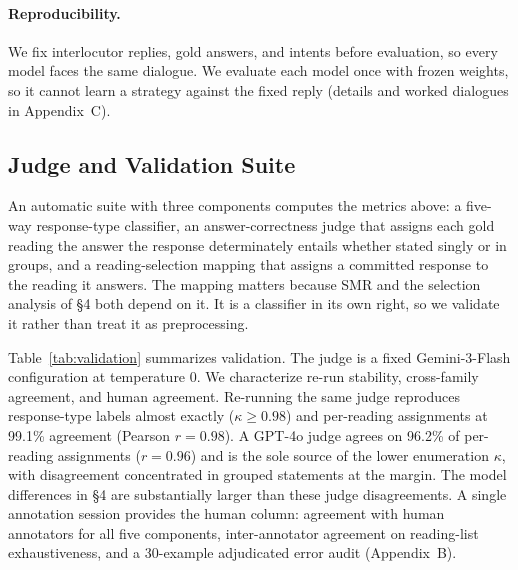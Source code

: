 \paragraph{Reproducibility.} We fix interlocutor replies, gold answers, and intents before evaluation, so every model faces the same dialogue. We evaluate each model once with frozen weights, so it cannot learn a strategy against the fixed reply (details and worked dialogues in Appendix~C).

\subsection{Judge and Validation Suite}
\label{sec:judge}


An automatic suite with three components computes the metrics above: a five-way response-type classifier, an answer-correctness judge that assigns each gold reading the answer the response determinately entails whether stated singly or in groups, and a reading-selection mapping that assigns a committed response to the reading it answers. The mapping matters because SMR and the selection analysis of \S4 both depend on it. It is a classifier in its own right, so we validate it rather than treat it as preprocessing.

Table~\ref{tab:validation} summarizes validation. The judge is a fixed Gemini-3-Flash configuration at temperature 0. We characterize re-run stability, cross-family agreement, and human agreement. Re-running the same judge reproduces response-type labels almost exactly ($\kappa \geq 0.98$) and per-reading assignments at 99.1\% agreement (Pearson $r = 0.98$). A GPT-4o judge agrees on 96.2\% of per-reading assignments ($r = 0.96$) and is the sole source of the lower enumeration $\kappa$, with disagreement concentrated in grouped statements at the margin. The model differences in \S4 are substantially larger than these judge disagreements. A single annotation session provides the human column: agreement with human annotators for all five components, inter-annotator agreement on reading-list exhaustiveness, and a 30-example adjudicated error audit (Appendix~B).
